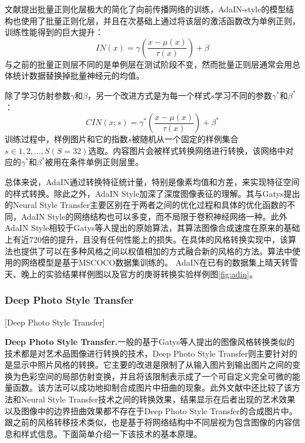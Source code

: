 文献\cite{ioffe}提出批量正则化层极大的简化了向前传播网络的训练，AdaIN-style的模型结构也使用了批量正则化层，并且在次基础上通过将该层的激活函数改为单例正则，训练性能得到的巨大提升：
$$ IN(x)=\gamma(\frac{x-\mu(x)}{\tau(x)})+\beta$$
与之前的批量正则层不同的是单例层在测试阶段不变，然而批量正则层通常会用总体统计数据替换掉批量神经元的均值。

除了学习仿射参数$\gamma$和$\beta$，另一个改进方式是为每一个样式$s$学习不同的参数$\gamma^*$和$\beta^*$：
$$CIN(x;s)=\gamma^*(\frac{x-\mu(x)}{\tau(x)})+\beta^*$$
训练过程中，样例图片和它的指数$s$被随机从一个固定的样例集合$s\in {1,2,\dots,S}(S=32)$选取。内容图片会被样式转换网络进行转换，该网络中对应的$\gamma^*$和$\beta^*$被用在条件单例正则层里。

总体来说，AdaIN通过转换特征统计量，特别是像素均值和方差，来实现特征空间的样式转换。除此之外，AdaIN Style加深了深度图像表征的理解。其与Gatys提出的Neural Style Transfer主要区别在于两者之间的优化过程和具体的优化函数的不同，AdaIN Style的网络结构也可以多变，而不局限于卷积神经网络一种。此外AdaIN Style相较于Gatys等人提出的原始算法，其算法图像合成速度在原来的基础上有近720倍的提升\cite{adin-github}，且没有任何性能上的损失。在具体的风格转换实现中，该算法也提供了可以在多种风格之间以权值相加的方式融合新的风格的方法。算法中使用的网络模型是基于MSCOCO\cite{mscoco}数据集训练的。
AdaIN在已有的数据集上晴天转雪天、晚上的实验结果样例图以及官方的庚哥转换实验样例图\ref{fig:adin}。


\subsubsection{Deep Photo Style Transfer}[Deep Photo Style Transfer]

\textbf{Deep Photo Style Transfer.}\cite{dpst}\quad  一般的基于Gatys等人提出的图像风格转换类似的技术都是对艺术品图像进行转换的技术，Deep Photo Style Transfer则主要针对的是显示中照片风格的转换。它主要的改进是限制了从输入图片到输出图片之间的变换为色彩空间的局部仿射变换，并且将该限制表示成了一个可自定义完全可微的能量函数。该方法可以成功地抑制合成图片中扭曲的现象。此外文献\cite{dpst}中还比较了该方法和Neural Style Transfer技术之间的转换效果，结果显示在后者出现的艺术效果以及图像中的边界扭曲效果都不存在于Deep Photo Style Transfer的合成图片中。跟之前的风格转移技术类似，也是基于将网络结构中不同层视为包含图像的内容信息和样式信息。下面简单介绍一下该技术的基本原理。

